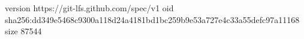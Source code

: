 version https://git-lfs.github.com/spec/v1
oid sha256:dd349e5468c9300a118d24a4181bd1bc259b9e53a727e4c33a55defc97a11168
size 87544
